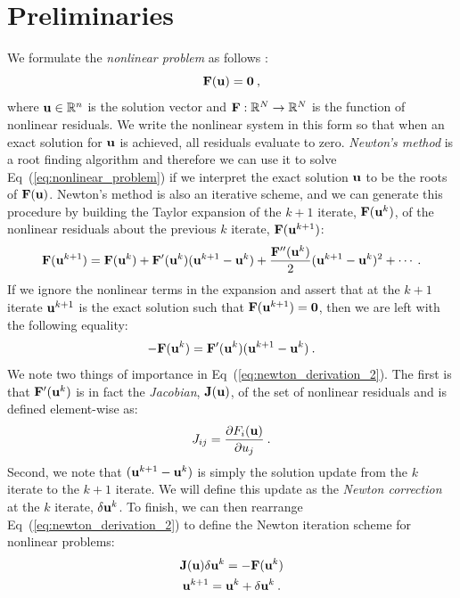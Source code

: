 \section{Preliminaries\ }
\label{sec:nonlinear_preliminaries}
We formulate the \textit{nonlinear problem} as follows
\citep{knoll_jacobian-free_2004}:
\begin{equation}
  \mathbf{F}(\mathbf{u}) = \mathbf{0}\:,
  \label{eq:nonlinear_problem}
\end{equation}
where $\mathbf{u} \in \mathbb{R}^n$ is the solution vector and
$\mathbf{F}:\mathbb{R}^N \rightarrow \mathbb{R}^N$ is the function of
nonlinear residuals. We write the nonlinear system in this form so
that when an exact solution for $\mathbf{u}$ is achieved, all residuals
evaluate to zero. \textit{Newton's method} is a root finding algorithm
and therefore we can use it to solve Eq~(\ref{eq:nonlinear_problem})
if we interpret the exact solution $\mathbf{u}$ to be the roots of
$\mathbf{F}(\mathbf{u})$. Newton's method is also an iterative scheme, and we
can generate this procedure by building the Taylor expansion of the
$k+1$ iterate, $\mathbf{F}(\mathbf{u}^k)$, of the nonlinear residuals about
the previous $k$ iterate, $\mathbf{F}(\mathbf{u}^{k+1})$:
\begin{equation}
  \mathbf{F}(\mathbf{u}^{k+1}) = \mathbf{F}(\mathbf{u}^{k}) +
  \mathbf{F}'(\mathbf{u}^{k})(\mathbf{u}^{k+1}-\mathbf{u}^{k}) +
  \frac{\mathbf{F}''(\mathbf{u}^{k})}{2}(\mathbf{u}^{k+1}-\mathbf{u}^{k})^2 + \cdots
  \:.
  \label{eq:newton_derivation_1}
\end{equation}
If we ignore the nonlinear terms in the expansion and assert that at
the $k+1$ iterate $\mathbf{u}^{k+1}$ is the exact solution such that
$\mathbf{F}(\mathbf{u}^{k+1}) = \mathbf{0}$, then we are left with the following
equality:
\begin{equation}
  -\mathbf{F}(\mathbf{u}^{k}) =
  \mathbf{F}'(\mathbf{u}^{k})(\mathbf{u}^{k+1}-\mathbf{u}^{k})\:.
  \label{eq:newton_derivation_2}
\end{equation}
We note two things of importance in
Eq~(\ref{eq:newton_derivation_2}). The first is that
$\mathbf{F}'(\mathbf{u}^{k})$ is in fact the \textit{Jacobian},
$\mathbf{J}(\mathbf{u})$, of the set of nonlinear residuals and is defined
element-wise as:
\begin{equation}
  J_{ij} = \frac{\partial F_i(\mathbf{u})}{\partial u_j}\:.
  \label{eq:jacobian_def}
\end{equation}
Second, we note that $(\mathbf{u}^{k+1}-\mathbf{u}^{k})$ is simply the
solution update from the $k$ iterate to the $k+1$ iterate. We will
define this update as the \textit{Newton correction} at the $k$
iterate, $\delta \mathbf{u}^k$. To finish, we can then rearrange
Eq~(\ref{eq:newton_derivation_2}) to define the Newton iteration
scheme for nonlinear problems:
\begin{subequations}
  \begin{gather}
    \mathbf{J}(\mathbf{u}) \delta \mathbf{u}^k = -\mathbf{F}(\mathbf{u}^{k})\\
    \mathbf{u}^{k+1} = \mathbf{u}^k + \delta \mathbf{u}^k\:.
  \end{gather}
  \label{eq:newton_iteration}
\end{subequations}

